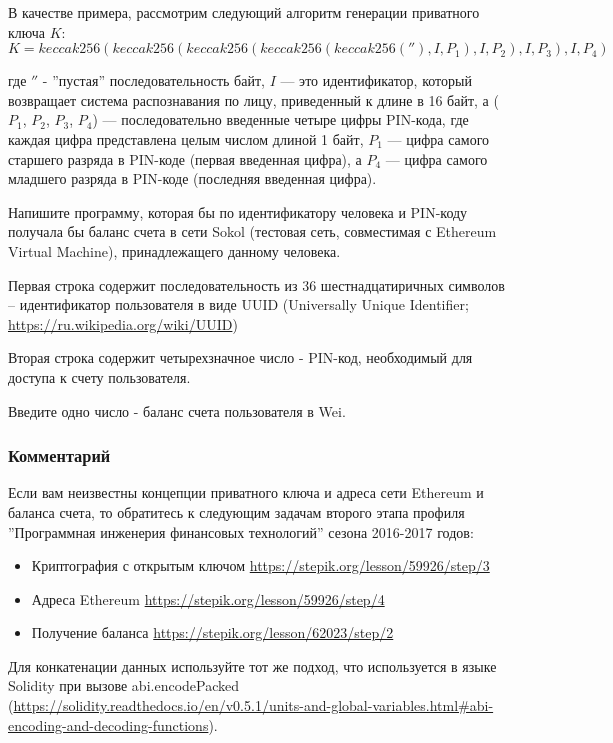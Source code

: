 В качестве примера, рассмотрим следующий алгоритм генерации приватного ключа $K$:
$$K = keccak256(keccak256(keccak256(keccak256(keccak256(''), I, P_1), I, P_2), I, P_3), I, P_4)$$

где $''$ - ''пустая'' последовательность байт, $I$ --- это идентификатор, который возвращает система распознавания по лицу, приведенный к длине в 16 байт, а ($P_1$, $P_2$, $P_3$, $P_4$) --- последовательно введенные четыре цифры PIN-кода, где каждая цифра представлена целым числом длиной 1 байт, $P_1$ --- цифра самого старшего разряда в PIN-коде (первая введенная цифра), а $P_4$ --- цифра самого младшего разряда в PIN-коде (последняя введенная цифра).

Напишите программу, которая бы по идентификатору человека и PIN-коду получала бы баланс счета в сети Sokol (тестовая сеть, совместимая с Ethereum Virtual Machine), принадлежащего данному человека.


Первая строка содержит последовательность из 36 шестнадцатиричных символов –  идентификатор пользователя в виде UUID (Universally Unique Identifier; \url{https://ru.wikipedia.org/wiki/UUID})

Вторая строка содержит четырехзначное число - PIN-код, необходимый для доступа к счету пользователя.

\outputfmtSection

Введите одно число - баланс счета пользователя в Wei.

\subsubsection*{Комментарий}

Если вам неизвестны концепции приватного ключа и адреса сети Ethereum и баланса счета, то обратитесь к 
следующим задачам второго этапа профиля ''Программная инженерия финансовых технологий'' сезона 2016-2017 годов:

\begin{itemize}
    \item Криптография с открытым ключом \url{https://stepik.org/lesson/59926/step/3}
    \item Адреса Ethereum \url{https://stepik.org/lesson/59926/step/4}
    \item Получение баланса \url{https://stepik.org/lesson/62023/step/2}
\end{itemize}

Для конкатенации данных используйте тот же подход, что используется в языке Solidity при вызове abi.encodePacked (\url{https://solidity.readthedocs.io/en/v0.5.1/units-and-global-variables.html#abi-encoding-and-decoding-functions}).

